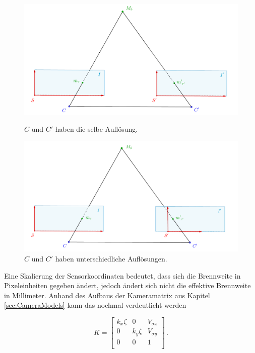 \begin{figure}[!htb]
	\includegraphics[width=\linewidth]{images/SensorSelbeAufloesung_beschriftet.png}
	\caption[Sensorkoordinatensysteme bei Kameras gleicher Auflösung]{$C$ und $C'$ haben die selbe Auflösung.}
	\label{fig:Aufl1}
	\endminipage\hfill
	\includegraphics[width=\linewidth]{images/SensorUnterschiedlicheAufloesung_beschriftet.png}
	\caption[Sensorkoordinatensysteme bei Kameras unterschiedlicher Auflösung]{$C$ und $C'$ haben unterschiedliche Auflösungen.}
	\label{fig:Aufl2}
	\endminipage\hfill
\end{figure}


Eine Skalierung der Sensorkoordinaten bedeutet, dass sich die Brennweite in Pixeleinheiten gegeben ändert, jedoch ändert sich nicht die effektive Brennweite in Millimeter. Anhand des Aufbaus der Kameramatrix aus Kapitel \ref{sec:CameraModels} kann das nochmal verdeutlicht werden

\begin{equation}
K=  \begin{bmatrix}
k_x \zeta & 0 & V_{\sigma x}\\
0 & k_y \zeta & V_{\sigma y}\\
0 & 0   & 1 \\
\end{bmatrix} \, .
\end{equation}

